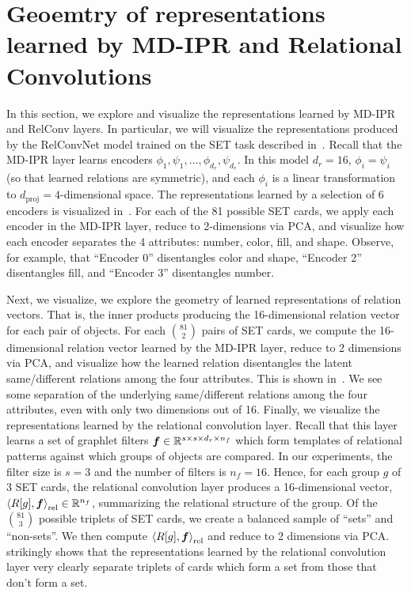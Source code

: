 \section{Geoemtry of representations learned by MD-IPR and Relational Convolutions}\label{sec:appendix_rep_analysis}

In this section, we explore and visualize the representations learned by MD-IPR and RelConv layers. In particular, we will visualize the representations produced by the RelConvNet model trained on the SET task described in~. Recall that the MD-IPR layer learns encoders $\phi_1, \psi_1, \ldots, \phi_{d_r}, \psi_{d_r}$. In this model $d_r = 16$, $\phi_i = \psi_i$ (so that learned relations are symmetric), and each $\phi_i$ is a linear transformation to $d_{\mathrm{proj}} = 4$-dimensional space. The representations learned by a selection of 6 encoders is visualized in~. For each of the 81 possible SET cards, we apply each encoder in the MD-IPR layer, reduce to 2-dimensions via PCA, and visualize how each encoder separates the 4 attributes: number, color, fill, and shape. Observe, for example, that ``Encoder 0'' disentangles color and shape, ``Encoder 2'' disentangles fill, and ``Encoder 3'' disentangles number.

Next, we visualize, we explore the geometry of learned representations of relation vectors. That is, the inner products producing the 16-dimensional relation vector for each pair of objects. For each $\binom{81}{2}$ pairs of SET cards, we compute the 16-dimensional relation vector learned by the MD-IPR layer, reduce to 2 dimensions via PCA, and visualize how the learned relation disentangles the latent same/different relations among the four attributes. This is shown in~. We see some separation of the underlying same/different relations among the four attributes, even with only two dimensions out of 16.
Finally, we visualize the representations learned by the relational convolution layer. Recall that this layer learns a set of graphlet filters $\bm{f} \in \mathbb{R}^{s \times s \times d_r \times n_f}$ which form templates of relational patterns against which groups of objects are compared. In our experiments, the filter size is $s = 3$ and the number of filters is $n_f = 16$. Hence, for each group $g$ of 3 SET cards, the relational convolution layer produces a 16-dimensional vector, $\left\langle R[g], \bm{f} \right\rangle_\mathrm{rel} \in \mathbb{R}^{n_f}$, summarizing the relational structure of the group. Of the $\binom{81}{3}$ possible triplets of SET cards, we create a balanced sample of ``sets'' and ``non-sets''. We then compute $\left\langle R[g], \bm{f} \right\rangle_\mathrm{rel}$ and reduce to 2 dimensions via PCA.~ strikingly shows that the representations learned by the relational convolution layer very clearly separate triplets of cards which form a set from those that don't form a set.


